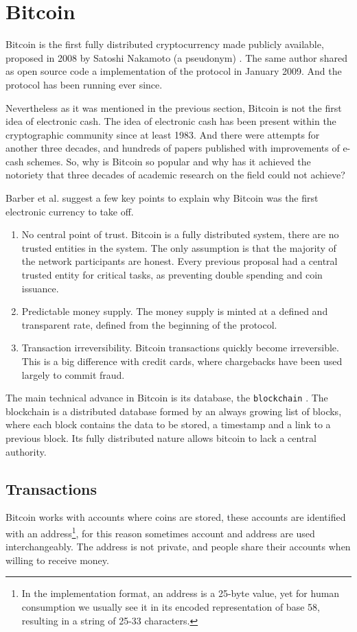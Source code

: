 \section{Bitcoin}
Bitcoin is the first fully distributed cryptocurrency made publicly available,
  proposed in 2008 by Satoshi Nakamoto (a pseudonym) \cite{nakamoto2008bitcoin}.
The same author shared as open source code a implementation of the protocol in
  January 2009. And the protocol has been running ever since.

Nevertheless as it was mentioned in the previous section, Bitcoin is not the
  first idea of electronic cash.
The idea of electronic cash has been present within the cryptographic community
  since at least 1983\cite{chaum1983blind}.
And there were attempts for another three decades, and hundreds of papers
  published with improvements of e-cash schemes\cite{barber2012bitter}.
So, why is Bitcoin so popular and why has it achieved the notoriety that three
  decades of academic research on the field could not achieve?

Barber et al.\cite{barber2012bitter} suggest a few key points to explain why
  Bitcoin was the first electronic currency to take off.
\begin{enumerate}
\item No central point of trust.
	Bitcoin is a fully distributed system, there are no trusted entities in the
	  system. The only assumption is that the majority of the network participants
	  are honest. Every previous proposal had a central trusted entity for
	  critical tasks, as preventing double spending and coin issuance.
\item Predictable money supply.
	The money supply is minted at a defined and transparent rate, defined from
	  the beginning of the protocol.
\item Transaction irreversibility.
	Bitcoin transactions quickly become irreversible. This is a big difference
	  with credit cards, where chargebacks have been used largely to commit
	  fraud.
\end{enumerate}

  The main technical advance in Bitcoin is its database, the
  \texttt{blockchain} \cite{inventionblockchain,blockchainmostimportant}.
The blockchain is a distributed database formed by an always growing list of
  blocks, where each block contains the data to be stored, a timestamp and a
  link to a previous block. Its fully distributed nature allows bitcoin to lack
  a central authority.

\subsection{Transactions}\label{subsec:Transaction}
Bitcoin works with accounts where coins are stored, these accounts are
  identified with an address\footnote{In the implementation format, an address
    is a 25-byte value, yet for human consumption we usually see it in its
    encoded representation of base 58, resulting in a string of 25-33
    characters.}, for this reason sometimes account and address are used
    interchangeably.
The address is not private, and people share their accounts when willing to
  receive money.

